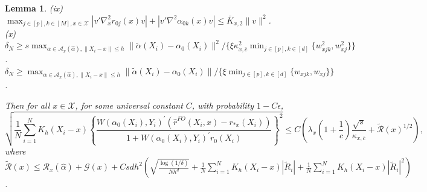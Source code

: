 \documentclass[10pt,a4paper]{amsart}
\newtheorem{lemma}{Lemma}
\begin{document}
\begin{lemma}
(ix) ${\displaystyle\max_{j\in [p], k\in[M], x\in \mathcal{X}}}|v'\nabla_{x}^2 r_{0j}(x)v|+ |v'\nabla^2\alpha_{0k}(x)v|\leq \bar{K}_{x,2}\|v\|^2$. \\
(x) $\delta_N\geq s{\displaystyle\max_{\alpha \in \mathcal{A}_x(\hat\alpha), \|X_i-x\|\leq h}}\|\tilde\alpha(X_i)-\alpha_0(X_i)\|^2/ \{\xi\kappa_{x,\bar c}^2{\displaystyle\min_{j\in[p], k\in[d]}}\{w_{xjk}^2,w_{xj}^2\}\}$. \\
$\delta_N\geq{\displaystyle\max_{\alpha \in \mathcal{A}_x(\hat\alpha), \|X_i-x\|\leq h}}\|\tilde\alpha(X_i)-\alpha_0(X_i)\|/ \{\xi{\displaystyle\min_{j\in[p], k\in[d]}}\{w_{xjk},w_{xj}\}\}$. 

Then for all $x \in \mathcal{X}$, for some universal constant $C$, with probability $1-C\epsilon$, 
$$\sqrt{\frac{1}{N} \sum_{i=1}^NK_h(X_i-x)\left\{\frac{W(\alpha_0(X_i),Y_i)^\prime(\hat{r}^{FO}(X_i,x)-r_{*x}(X_i))}{1+W(\alpha_0(X_i),Y_i)^\prime r_0(X_i)}\right\}^2}\leq C\left(\lambda_x \left( 1 + \frac{1}{c}\right) \frac{\sqrt{s}}{\kappa_{x,\bar{c}}} + \widetilde{\mathcal{R}}(x)^{1/2}\right),$$
where $\displaystyle\widetilde{\mathcal{R}}(x)\leq \mathcal{R}_x(\hat\alpha) + \mathcal{G}(x) + Csdh^2\left(\!\!\sqrt{\frac{\log(1/\delta)}{Nh^d}}\! + \! \frac{1}{N}\sum_{i=1}^NK_h(X_i-x)|\widetilde{R}_i|\!+\!\frac{1}{N}\sum_{i=1}^NK_h(X_i-x)|\widetilde{R}_i|^2\right)$.
\end{lemma}
\end{document}
